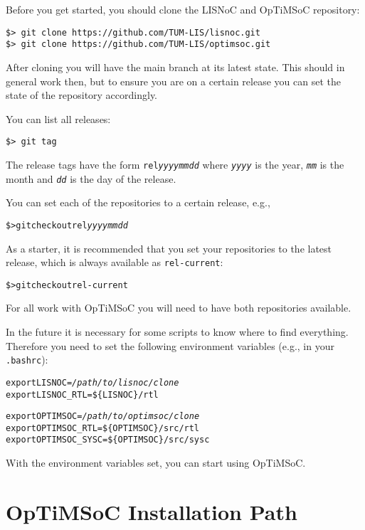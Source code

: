 Before you get started, you should clone the LISNoC and OpTiMSoC
repository:

\begin{verbatim}
$> git clone https://github.com/TUM-LIS/lisnoc.git
$> git clone https://github.com/TUM-LIS/optimsoc.git
\end{verbatim}

After cloning you will have the main branch at its latest state. This
should in general work then, but to ensure you are on a certain
release you can set the state of the repository accordingly.

You can list all releases:

\begin{verbatim}
$> git tag
\end{verbatim}

The release tags have the form \texttt{rel\emph{yyyymmdd}} where
\texttt{\emph{yyyy}} is the year, \texttt{\emph{mm}} is the month and
\texttt{\emph{dd}} is the day of the release.

You can set each of the repositories to a certain release, e.g.,

\begin{alltt}
\$> git checkout rel\emph{yyyymmdd}
\end{alltt}

As a starter, it is recommended that you set your repositories to the
latest release, which is always available as \texttt{rel-current}:

\begin{alltt}
\$> git checkout rel-current
\end{alltt}

For all work with OpTiMSoC you will need to have both repositories
available.

In the future it is necessary for some scripts to know where to find
everything. Therefore you need to set the following environment
variables (e.g., in your \verb|.bashrc|):

\begin{alltt}
export LISNOC=\emph{/path/to/lisnoc/clone}
export LISNOC_RTL=\$\{LISNOC\}/rtl

export OPTIMSOC=\emph{/path/to/optimsoc/clone}
export OPTIMSOC_RTL=\$\{OPTIMSOC\}/src/rtl
export OPTIMSOC_SYSC=\$\{OPTIMSOC\}/src/sysc
\end{alltt}

With the environment variables set, you can start using OpTiMSoC.

\section{OpTiMSoC Installation Path}

